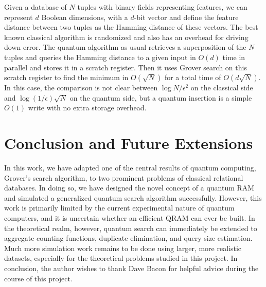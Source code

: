 \documentclass{toc}
\theoremstyle{plain}
\theoremstyle{definition}
\begin{document}
Given a database of $N$ tuples with binary fields representing features,
we can represent $d$ Boolean dimensions,
 with a $d$-bit vector and define the
feature distance between two tuples as the Hamming distance of these vectors.
The best known classical algorithm \cite{indyk04} is randomized
and also has an overhead for driving down error. The quantum algorithm
as usual retrieves a superposition of the $N$ tuples and queries the
Hamming distance to a given input in $O(d)$ time in parallel and stores
it in a scratch register. Then it uses Grover search on this scratch
register to find the minimum in $O(\sqrt{N})$
\cite{durr96} for a total time of $O(d\sqrt{N})$.
In this case, the comparison is not clear between $\log{N}/\epsilon^2$ on
the classical side and $\log(1/\epsilon)\sqrt{N}$ on the quantum side, but
a quantum insertion is a simple $O(1)$ write with no extra storage overhead.

\section{Conclusion and Future Extensions}
\label{sec:conclude}

In this work, we have adapted one of the central results of quantum
computing, Grover's search algorithm, to two prominent problems of
classical relational databases. In doing so, we have designed the novel
concept of a quantum RAM and simulated a generalized quantum search
algorithm successfully.
However, this work is primarily limited by the current experimental
nature of quantum computers, and it is uncertain whether an efficient
QRAM can ever be built. In the theoretical realm, however, quantum search
can immediately be extended to aggregate counting functions, duplicate
elimination, and query size estimation.
Much more simulation work remains to be done using larger,
more realistic datasets, especially for the theoretical
problems studied in this project.
In conclusion, the author wishes to thank Dave Bacon for helpful advice
during the
course of this project.



\end{document}
